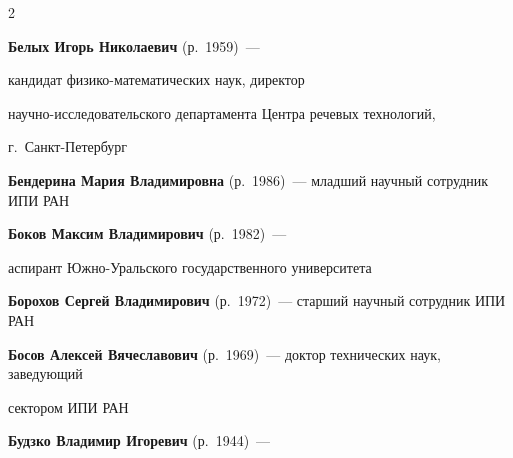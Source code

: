 \begin{multicols}{2}






\noindent

\textbf{Белых Игорь Николаевич} (р.\ 1959)~--- 

кандидат фи\-зи\-ко-математических наук, директор 

научно-ис\-сле\-до\-ва\-тель\-ско\-го департамента Центра речевых технологий, 

г.~Санкт-Пе\-тер\-бург



\vspace*{6pt}



\noindent

\textbf{Бендерина Мария Владимировна} (р.\ 1986)~--- младший научный сотрудник ИПИ РАН



\vspace*{6pt}





\noindent

\textbf{Боков Максим Владимирович} (р.\ 1982)~--- 

аспирант Южно-Уральского государственного университета



\vspace*{6pt}



\noindent

\textbf{Борохов Сергей Владимирович} (р.\ 1972)~--- старший научный сотрудник ИПИ РАН



\vspace*{6pt}



\noindent

\textbf{Босов Алексей Вячеславович} (р.\ 1969)~--- доктор технических наук, заведующий

сектором ИПИ РАН



\vspace*{6pt}



\noindent

\textbf{Будзко Владимир Игоревич} (р.\ 1944)~--- 


\end{multicols}
